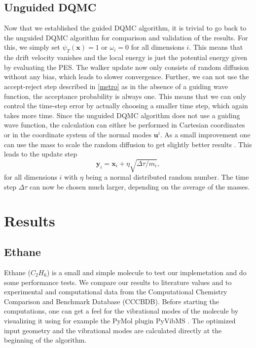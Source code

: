 \documentclass [12pt]{report}
\begin{document}
\section{Unguided DQMC} \label{uDQMC}
Now that we established the guided DQMC algorithm, it is trivial to go back to the unguided DQMC algorithm for comparison and validation of the results. For this, we simply set $\psi_T(\bm{x}) = 1$ or $\omega_i = 0$ for all dimensions $i$. This means that the drift velocity vanishes and the local energy is just the potential energy given by evaluating the PES. The walker update now only consists of random diffusion without any bias, which leads to slower convergence. Further, we can not use the accept-reject step described in \ref{metro} as in the absence of a guiding wave function, the acceptance probability is always one. This means that we can only control the time-step error by actually choosing a smaller time step, which again takes more time. Since the unguided DQMC algorithm does not use a guiding wave function, the calculation can either be performed in Cartesian coordinates or in the coordinate system of the normal modes $\bm{u}^i$. As a small improvement one can use the mass to scale the random diffusion to get slightly better results \cite{mccoy}. This leads to the update step
\begin{equation}
\bm{y}_i = \bm{x}_i + \eta\sqrt{\Delta \tau/m_i},
\end{equation}
for all dimensions $i$ with $\eta$ being a normal distributed random number. The time step $\Delta \tau$ can now be chosen much larger, depending on the average of the masses.

\chapter{Results}

\section{Ethane}

Ethane ($C_2H_6$) is a small and simple molecule to test our implemetation and do some performance tests. We compare our results to literature values\cite{c2h6} and to experimental and computational data from the Computational Chemistry Comparison and Benchmark Database (CCCBDB)\cite{cccbdb}. Before starting the computations, one can get a feel for the vibrational modes of the molecule by visualizing it using for example the PyMol plugin PyVibMS \cite{PyVibMS}. The optimized input geometry and the vibrational modes are calculated directly at the beginning of the algorithm. 
\end{document}
